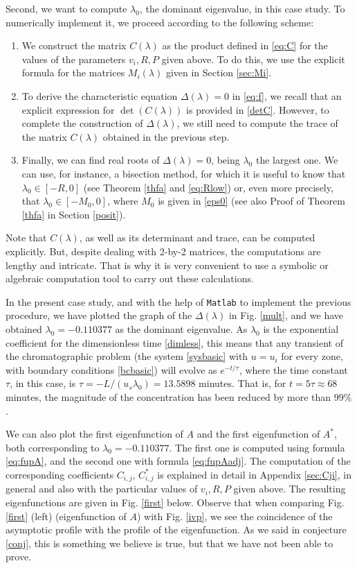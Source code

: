 \documentclass[a4paper]{article}
\newcommand{\X}[3]{#1_{#3,#2}}
\newcommand{\Xe}[3]{#1^*_{#3,#2}}
\numberwithin{equation}{section}
\begin{document}
Second, we want to compute $\lambda_0$, the dominant eigenvalue, in this case study. To numerically implement it, we proceed according to the following scheme:
\begin{enumerate}
\item We construct the matrix $C(\lambda)$ as the product defined in \eqref{eq:C} for the values of the parameters $v_i,R,P$ given above. To do this, we use the explicit formula for the matrices $M_i(\lambda)$ given in Section \ref{sec:Mi}.
\item To derive the characteristic equation $\Delta(\lambda)=0$ in \eqref{eq:f}, we recall that an explicit expression for $\det(C(\lambda))$ is provided in \eqref{detC}. However, to complete the construction of $\Delta(\lambda)$, we still need to compute the trace of the matrix $C(\lambda)$ obtained in the previous step.
\item Finally, we can find real roots of $\Delta(\lambda)=0$, being $\lambda_0$ the largest one. We can use, for instance, a bisection method, for which it is useful to know that $\lambda_0\in [-R,0]$ (see Theorem \ref{thfa} and \eqref{eq:Rlow}) or, even more precisely, that $\lambda_0\in [-M_0,0]$, where $M_0$ is given in \eqref{eps0} (see also Proof of Theorem \ref{thfa} in Section \ref{posit}).
\end{enumerate}
Note that $C(\lambda)$, as well as its determinant and trace, can be computed explicitly. But, despite dealing with 2-by-2 matrices, the computations are lengthy and intricate. That is why it is very convenient to use a symbolic or algebraic computation tool to carry out these calculations.

In the present case study, and with the help of \verb"Matlab" to implement the previous procedure, we have plotted the graph of the $\Delta(\lambda)$ in Fig. \ref{mult}, and we have obtained $\lambda_0 = -0.110377$ as the dominant eigenvalue. As $\lambda_0$ is the exponential coefficient for the dimensionless time \eqref{dimless}, this means that any transient of the chromatographic problem (the system \eqref{sysbasic} with $u=u_i$ for every zone, with boundary conditions \eqref{bcbasic}) will evolve as $e^{-t / \tau}$, where the time constant $\tau$, in this case, is $\tau=-L/(u_s \lambda_0)=13.5898$ minutes. That is, for $t=5\tau\approx68$ minutes, the magnitude of the concentration has been reduced by more than $99 \%$.

We can also plot the first eigenfunction of $A$ and the first eigenfunction of $A^*$, both corresponding to $\lambda_0 = -0.110377$. The first one is computed using formula \eqref{eq:fupA}, and the second one with formula \eqref{eq:fupAadj}. The computation of the corresponding coefficients $\X{C}{j}{i}$, $\Xe{C}{j}{i}$ is explained in detail in Appendix \ref{sec:Cji}, in general and also with the particular values of $v_i,R,P$ given above. The resulting eigenfunctions are given in Fig. \ref{first} below. Observe that when comparing Fig. \ref{first} (left) (eigenfunction of $A$) with Fig.  \ref{ivp}, we see the coincidence of the asymptotic profile with the profile of the eigenfunction. As we said in conjecture \eqref{conj}, this is something we believe is true, but that we have not been able to prove.
\end{document}
